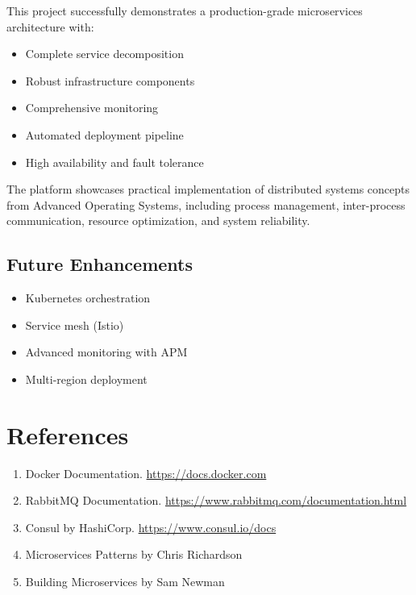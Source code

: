 \documentclass[12pt,a4paper]{article}
\begin{document}
This project successfully demonstrates a production-grade microservices architecture with:
\begin{itemize}
    \item Complete service decomposition
    \item Robust infrastructure components
    \item Comprehensive monitoring
    \item Automated deployment pipeline
    \item High availability and fault tolerance
\end{itemize}

The platform showcases practical implementation of distributed systems concepts from Advanced Operating Systems, including process management, inter-process communication, resource optimization, and system reliability.

\subsection{Future Enhancements}
\begin{itemize}
    \item Kubernetes orchestration
    \item Service mesh (Istio)
    \item Advanced monitoring with APM
    \item Multi-region deployment
\end{itemize}

\section*{References}

\begin{enumerate}
    \item Docker Documentation. \url{https://docs.docker.com}
    \item RabbitMQ Documentation. \url{https://www.rabbitmq.com/documentation.html}
    \item Consul by HashiCorp. \url{https://www.consul.io/docs}
    \item Microservices Patterns by Chris Richardson
    \item Building Microservices by Sam Newman
\end{enumerate}
\end{document}
